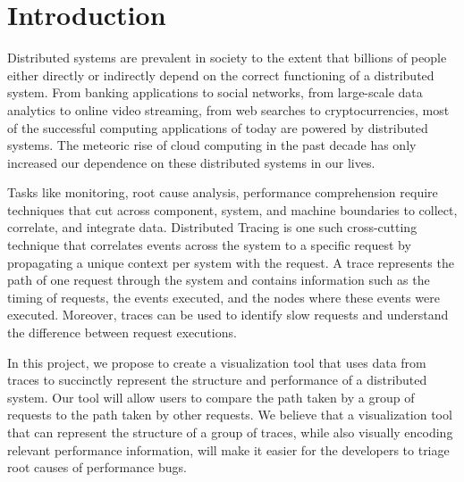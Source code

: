 \section{Introduction}

Distributed systems are prevalent in society to the extent that billions of people either directly or 
indirectly depend on the correct functioning of a distributed system. From banking applications to social
networks, from large-scale data analytics to online video streaming, from web searches to cryptocurrencies,
most of the successful computing applications of today are powered by distributed systems.
The meteoric rise of cloud computing in the past decade has only increased our dependence on these
distributed systems in our lives.

Tasks like monitoring, root cause analysis, performance comprehension require techniques that cut across component,
system, and machine boundaries to collect, correlate, and integrate data. Distributed Tracing is one such cross-cutting technique
that correlates events across the system to a specific request by propagating a unique context per system with the request.
A trace represents the path of one request through the system and contains information such as the timing of requests, 
the events executed, and the nodes where these events were executed. Moreover, traces can be used
to identify slow requests and understand the difference between request executions. 

In this project, we propose to create a visualization tool that uses data from traces to succinctly represent the structure 
and performance of a distributed system. Our tool will allow users to compare the path taken by a group
of requests to the path taken by other requests. We believe that a visualization tool that can represent the
structure of a group of traces, while also visually encoding relevant performance information, will make
it easier for the developers to triage root causes of performance bugs.
